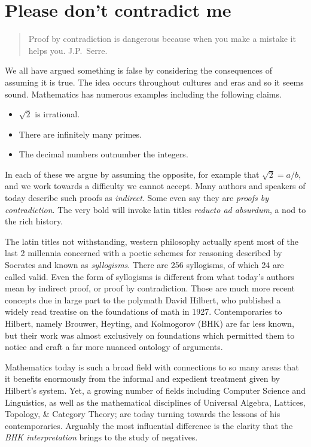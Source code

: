 
\chapter{Please don't contradict me}

\begin{quote}
    Proof by contradiction is dangerous because 
    when you make a mistake it helps you.
    \hfill J.P.~Serre.
\end{quote}
We all have argued something is false by considering the consequences 
of assuming it is true.   The idea occurs throughout cultures and 
eras and so it seems sound.  Mathematics has numerous examples including 
the following claims.
\begin{itemize}
    \item $\sqrt{2}$ is irrational.
    \item There are infinitely many primes.
    \item The decimal numbers outnumber the integers.
\end{itemize}
In each of these we argue by assuming the opposite, for example 
that $\sqrt{2}=a/b$, and we work towards a difficulty we cannot accept.
Many authors and speakers of today describe such proofs as 
\emph{indirect}.  Some even say they are \emph{proofs by contradiction}.
The very bold will invoke latin titles
\emph{reducto ad absurdum}, a nod to the rich history.

The latin titles not withstanding, western philosophy actually spent most of the
last 2 millennia concerned with a poetic schemes for reasoning described by
Socrates and known as \emph{syllogisms}.  There are 256 syllogisms, of which 24
are called valid.  Even the form of syllogisms is different from what 
today's authors mean by indirect proof, or proof by contradiction.  Those are
much more recent concepts due in large part to the polymath David Hilbert, who
published a widely read treatise on the foundations of math in 1927.
Contemporaries to Hilbert, namely Brouwer, Heyting, and Kolmogorov (BHK) are far
less known, but their work was almost exclusively on foundations 
which permitted them to notice and craft a far more nuanced ontology of arguments.

Mathematics today is such a broad field with connections to so many areas that
it benefits enormously from the informal and expedient treatment given by
Hilbert's system.  Yet, a growing number of fields including Computer Science
and Linguistics, as well as the mathematical disciplines of Universal Algebra,
Lattices,  Topology, \& Category Theory; are today turning towards the lessons
of his contemporaries.  Arguably the most influential difference is the clarity
that the \emph{BHK interpretation} brings to the study of negatives.


